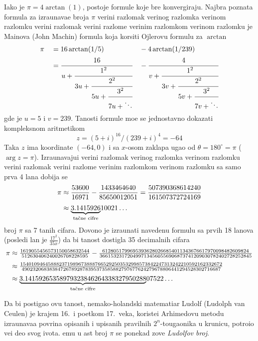 \documentclass[12pt, twoside, a4paper]{article}
\def\vr#1{\ifcase#1\relax\or
  ve\-ri{\zv}\-ni raz\-lo\-mak\or
  ve\-ri{\zv}\-nog raz\-lom\-ka\or
  ve\-ri{\zv}\-nom raz\-lom\-ku\or
  ve\-ri{\zv}\-ni raz\-lo\-mak\or
  ve\-ri{\zv}\-ni raz\-lom\-{\cv}e\or
  ve\-ri{\zv}\-nim raz\-lom\-kom\or
  ve\-ri{\zv}\-nom raz\-lom\-ku\fi}
\begin{document}
Iako je $\pi=4\arctan(1)$, postoje formule koje br{\zv}e konvergiraju.
Najbr{\zv}a poznata formula za izra{\cv}unava{\nj}e broja $\pi$ \vr6 je
Ma{\cv}inova (John Machin) formula koja korsiti Ojlerovu formulu za $\arctan$
\begin{alignat*}{3}
&\pi
&&=16\arctan(1/5)
&&-4\arctan(1/239)\\
&{}
&&= \cfrac{16}{u+\cfrac{1^2}{3u+\cfrac{2^2}{5u+\cfrac{3^2}{7u+\ddots}}}}
&&- \cfrac{4}{v+\cfrac{1^2}{3v+\cfrac{2^2}{5v+\cfrac{3^2}{7v+\ddots}}}}
\end{alignat*}
gde je $u=5$ i $v=239$.
Ta{\cv}nosti formule mo{\zv}e se jednostavno dokazati kompleksnom aritmetikom
$$
z=(5+i)^{16} / (239+i)^4 = -64
$$
Ta{\cv}ka $z$ ima koordinate $(-64,0)$ i sa $x$-osom zaklapa ugao od $\theta=180^\circ=\pi$ 
($\arg z=\pi$).
Izra\-{\cv}u\-na\-va\-ju\-{\cc}i \vr1 sa samo prva 4 {\cv}lana dobija se
\begin{align*}
\pi
& \approx\frac{53600}{16971} - \frac{1433464640}{85650012051}
= \frac{507390368614240}{161507372724169}\\
\noalign{\smallskip}
& \approx \underbrace{3.1415926}_{\hbox{\scriptsize ta{\cv}ne cifre}}\!10021\ldots
\end{align*}
broj $\pi$ sa 7 ta{\cv}nih cifara. Dovo{\lj}no je izra{\cv}unati navedenu formulu sa
prvih 18 {\cv}lanova (posled{\nj}i {\cv}lan je $\frac{17^2}{35x}$) da bi ta{\cv}nost dostigla 35 decimalnih cifara
\begin{align*}
\pi 
&\approx\textstyle{{1619055456573150058632544\over512630406240026708228595}}
-\textstyle{{61280517996953936280266854011343676617970098482609824\over3661532317204997134560556906873741209030782402728252845}}\\
\noalign{\smallskip}
&\approx\textstyle{{1540109464588823719896738887665292503532998573842247313242210592162332672
\over490232068383847267892878395373585882797677624279678806441294528302716687}}\\
\noalign{\smallskip}
&\approx 
\underbrace{3.14159265358979323846264338327950288}_{\hbox{\scriptsize ta{\cv}ne cifre}}\!07522\ldots
\end{align*}

Da bi postigao ovu ta{\cv}nost, nema{\cv}ko-holandski matemati{\cv}ar Ludolf (Ludolph van Ceulen) je
krajem 16.~i po{\cv}etkom 17.~veka,
koriste{\cc}i Arhimedovu metodu izra{\cv}unava{\nj}a povr{\sv}ina opisanih i upisanih pravilnih $2^n$-tougaonika u kru{\zv}nicu,
potro{\sv}io ve{\cc}i deo svog {\zv}ivota. {\Nj}emu u {\cv}ast broj $\pi$ se ponekad zove
{\sl Ludolfov broj}.
\end{document}
